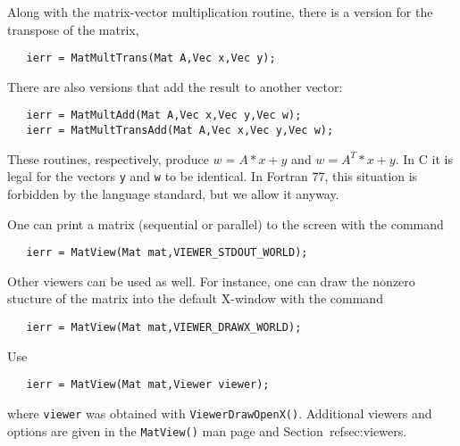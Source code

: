 Along with the matrix-vector multiplication routine, there is 
a version for the transpose of the matrix, 
\begin{verbatim}
   ierr = MatMultTrans(Mat A,Vec x,Vec y);
\end{verbatim}
There are also versions that add the result
to another vector:  
\begin{verbatim}
   ierr = MatMultAdd(Mat A,Vec x,Vec y,Vec w);
   ierr = MatMultTransAdd(Mat A,Vec x,Vec y,Vec w);
\end{verbatim}
These routines, respectively, produce $w = A*x + y$ and $w = A^{T}*x + y$. 
In C it is legal for the vectors {\tt y} and {\tt w} to be identical.
In Fortran 77, this situation is forbidden by the language standard, 
but we allow it anyway.

One can print a matrix (sequential or parallel) to the screen with the 
command 
\begin{verbatim}
   ierr = MatView(Mat mat,VIEWER_STDOUT_WORLD);
\end{verbatim}
Other viewers can be used as well. For instance, one can draw the
nonzero stucture of the matrix into the default X-window with the 
command 
\begin{verbatim}
   ierr = MatView(Mat mat,VIEWER_DRAWX_WORLD);
\end{verbatim}
Use 
\begin{verbatim}
   ierr = MatView(Mat mat,Viewer viewer);
\end{verbatim}
where {\tt viewer} was obtained with {\tt ViewerDrawOpenX()}.
Additional viewers and options are given in the {\tt MatView()} man
page and Section~ref{sec:viewers}.

